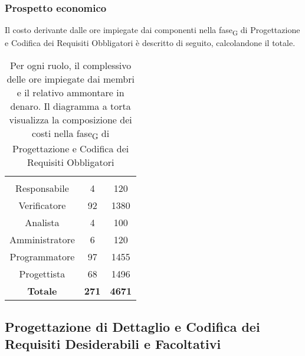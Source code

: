 \subsubsection{Prospetto economico}
Il costo derivante dalle ore impiegate dai componenti nella \gls{fase}\textsubscript{G} di Progettazione e Codifica dei Requisiti Obbligatori è descritto di seguito, calcolandone il totale.

\begin{table}[H]
	{\setlength{\parindent}{0cm}
		\begin{minipage}{.43\textwidth}
			\begin{tabular}{ccc}
				\rowcolorhead
				\headertitle{Ruolo} & \headertitle{Ore} & \headertitle{Costo(\euro{})}\\
				Responsabile & 4 & 120\\
				Verificatore & 92 & 1380\\
				Analista & 4 & 100\\
				Amministratore & 6 & 120\\
				Programmatore & 97 & 1455\\
				Progettista & 68 & 1496\\
				\hline
				\textbf{Totale} & \textbf{271} & \textbf{4671}\\
			\end{tabular}
		\end{minipage}%
		\begin{minipage}{.57\textwidth}
	\end{minipage} }
	\caption[Prospetto economico della \gls{fase}\textsubscript{G} di Progettazione e Codifica dei Requisiti Obbligatori]{Per ogni ruolo, il complessivo delle ore impiegate dai membri e il relativo ammontare in denaro. Il diagramma a torta visualizza la composizione dei costi nella \gls{fase}\textsubscript{G} di Progettazione e Codifica dei Requisiti Obbligatori}
\end{table} 




\subsection{Progettazione di Dettaglio e Codifica dei Requisiti Desiderabili e Facoltativi}



